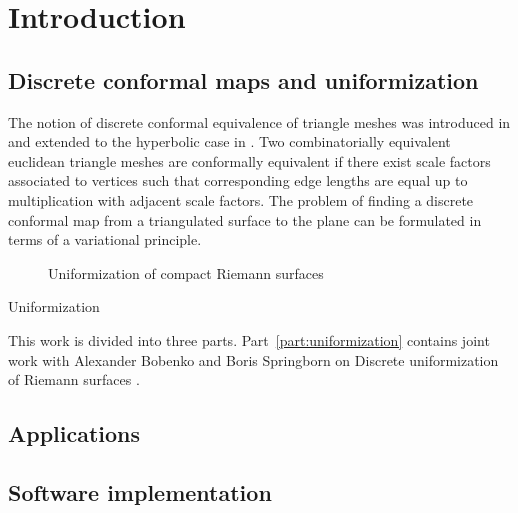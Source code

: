 \documentclass[Thesis.tex]{subfiles}
\begin{document}
\chapter{Introduction}

\section{Discrete conformal maps and uniformization}

The notion of discrete conformal equivalence of triangle meshes was introduced in \cite{Springborn2008} and extended to the hyperbolic case in \cite{Bobenko2010}. Two combinatorially equivalent euclidean triangle meshes are conformally equivalent if there exist scale factors associated to vertices such that corresponding edge lengths are equal up to multiplication with adjacent scale factors.
The problem of finding a discrete conformal map from a triangulated surface to the plane can be formulated in terms of a variational principle. 

\begin{figure}
\centering
{}
\caption{Uniformization of compact Riemann surfaces}
\label{fig:intro_uniformization}
\end{figure}


\begin{theorem}{Uniformization}

\end{theorem}


This work is divided into three parts. Part~\ref{part:uniformization} contains joint work with Alexander Bobenko and Boris Springborn on Discrete uniformization of Riemann surfaces \cite{BobSechSpr}. 

\section{Applications}

\section{Software implementation}


\subfilebibliography
\end{document}
